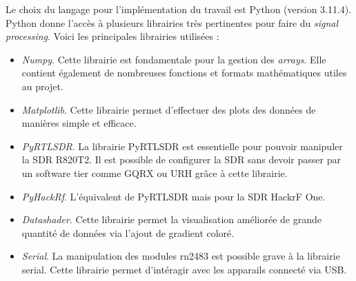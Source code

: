 Le choix du langage pour l'implémentation du travail est Python (version 3.11.4). Python donne l'accès à plusieurs librairies très pertinentes pour faire du \textit{signal processing}. Voici les principales librairies utilisées :

\vspace{0.1cm}

\begin{itemize}
\item \textit{Numpy}. Cette librairie est fondamentale pour la gestion des \textit{arrays}. Elle contient également de nombreuses fonctions et formats mathématiques utiles au projet.
\item \textit{Matplotlib}. Cette librairie permet d'effectuer des plots des données de manières simple et efficace.
\item \textit{PyRTLSDR}. La librairie PyRTLSDR est essentielle pour pouvoir manipuler la SDR R820T2. Il est possible de configurer la SDR sans devoir passer par un software tier comme GQRX ou URH grâce à cette librairie.
\item \textit{PyHackRf}. L'équivalent de PyRTLSDR mais pour la SDR HackrF One.
\item \textit{Datashader}. Cette librairie permet la visualisation améliorée de grande quantité de données via l'ajout de gradient coloré.
\item \textit{Serial}. La manipulation des modules rn2483 est possible grave à la librairie serial. Cette librairie permet d'intéragir avec les apparails connecté via USB.
\end{itemize}



